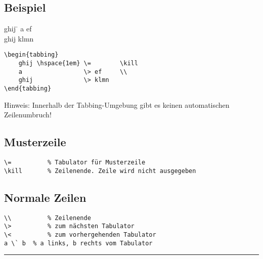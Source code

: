 \setlength{\columnseprule}{0.5pt}
\mycolumnbreak

\noindent\begin{minipage}{\linewidth}

\subsection*{Beispiel}

\begin{tabbing}
ghij \hspace{1em} \=  \kill
a     \> ef \\
ghij \>  klmn
\end{tabbing}

\vspace{-0.5\baselineskip}
\begin{lstlisting}
\begin{tabbing}
	ghij \hspace{1em} \=  		\kill
	a                 \> ef 	\\
	ghij              \> klmn
\end{tabbing}
\end{lstlisting}

\end{minipage}

Hinweis: Innerhalb der Tabbing-Umgebung gibt es keinen automatischen Zeilenumbruch!

\subsection*{Musterzeile}
\vspace{-0.5\baselineskip}
\begin{lstlisting}
\=			% Tabulator für Musterzeile
\kill		% Zeilenende. Zeile wird nicht ausgegeben
\end{lstlisting}

\subsection*{Normale Zeilen}
\vspace{-0.5\baselineskip}
\begin{lstlisting}
\\ 			% Zeilenende
\>			% zum nächsten Tabulator
\<			% zum vorhergehenden Tabulator
a \` b	% a links, b rechts vom Tabulator
\end{lstlisting}
%
\hrule \vspace{0.5\baselineskip}
